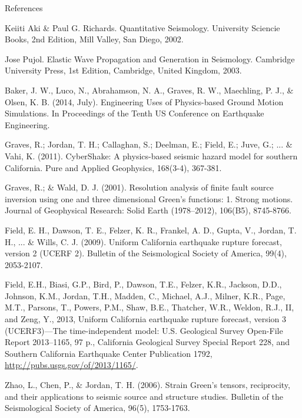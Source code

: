 %
%
%
%
\begin{frame}[allowframebreaks]{References}
\def\newblock{}
%
%

\begin{thebibliography}{1}

 Keiiti Aki \& Paul G. Richards. {Q}uantitative {S}eismology. University Sciencie Books, 2nd Edition, Mill Valley, San Diego, 2002.

 Jose Pujol. Elastic Wave Propagation and Generation in Seismology. Cambridge University Press, 1st Edition, Cambridge, United Kingdom, 2003.

 Baker, J. W., Luco, N., Abrahamson, N. A., Graves, R. W., Maechling, P. J., \& Olsen, K. B. (2014, July). Engineering Uses of Physics-based Ground Motion Simulations. In Proceedings of the Tenth US Conference on Earthquake Engineering.

 Graves, R.; Jordan, T. H.; Callaghan, S.; Deelman, E.; Field, E.; Juve, G.; ... \& Vahi, K. (2011). CyberShake: A physics-based seismic hazard model for southern California. Pure and Applied Geophysics, 168(3-4), 367-381.

 Graves, R.; \& Wald, D. J. (2001). Resolution analysis of finite fault source inversion using one and three dimensional Green's functions: 1. Strong motions. Journal of Geophysical Research: Solid Earth (1978–2012), 106(B5), 8745-8766.

 Field, E. H., Dawson, T. E., Felzer, K. R., Frankel, A. D., Gupta, V., Jordan, T. H., ... \& Wills, C. J. (2009). Uniform California earthquake rupture forecast, version 2 (UCERF 2). Bulletin of the Seismological Society of America, 99(4), 2053-2107.

 Field, E.H., Biasi, G.P., Bird, P., Dawson, T.E., Felzer, K.R., Jackson, D.D., Johnson, K.M., Jordan, T.H., Madden, C., Michael, A.J., Milner, K.R., Page, M.T., Parsons, T., Powers, P.M., Shaw, B.E., Thatcher, W.R., Weldon, R.J., II, and Zeng, Y., 2013, Uniform California earthquake rupture forecast, version 3 (UCERF3)—The time-independent model: U.S. Geological Survey Open-File Report 2013–1165, 97 p., California Geological Survey Special Report 228, and Southern California Earthquake Center Publication 1792, \url{http://pubs.usgs.gov/of/2013/1165/}.

 Zhao, L., Chen, P., \& Jordan, T. H. (2006). Strain Green’s tensors, reciprocity, and their applications to seismic source and structure studies. Bulletin of the Seismological Society of America, 96(5), 1753-1763.

\end{thebibliography}

\end{frame}




